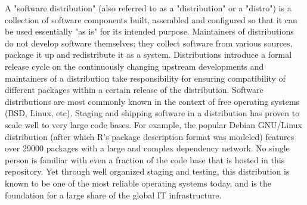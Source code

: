 A "software distribution" (also referred to as a "distribution" or a "distro")
is a collection of software components built, assembled and configured so that
it can be used essentially "as is" for its intended purpose. Maintainers of
distributions do not develop software themselves; they collect software from
various sources, package it up and redistribute it as a system. Distributions
introduce a formal release cycle on the continuously changing upstream
developments and maintainers of a distribution take responsibility for ensuring
compatibility of different packages within a certain release of the
distribution. Software distributions are most commonly known in the context of
free operating systems (BSD, Linux, etc). Staging and shipping software in a
distribution has proven to scale well to very large code bases. For example,
the popular Debian GNU/Linux distribution (after which R's package description
format was modeled) features over 29000 packages with a large and complex
dependency network. No single person is familiar with even a fraction of the
code base that is hosted in this repository. Yet through well organized staging and
testing, this distribution is known to be one of the most reliable operating
systems today, and is the foundation for a large share of the global IT
infrastructure.


